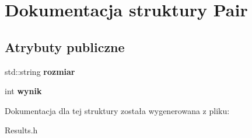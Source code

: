 \hypertarget{struct_pair}{}\section{Dokumentacja struktury Pair}
\label{struct_pair}
\subsection*{Atrybuty publiczne}
\begin{DoxyCompactItemize}
\item 
\hypertarget{struct_pair_ac7bc0b37d632674e21e292a1bfc64847}{}std\+::string {\bfseries rozmiar}\label{struct_pair_ac7bc0b37d632674e21e292a1bfc64847}

\item 
\hypertarget{struct_pair_a166971bff5d8b86e25f71dc1d1252daf}{}int {\bfseries wynik}\label{struct_pair_a166971bff5d8b86e25f71dc1d1252daf}

\end{DoxyCompactItemize}


Dokumentacja dla tej struktury została wygenerowana z pliku\+:\begin{DoxyCompactItemize}
\item 
Results.\+h\end{DoxyCompactItemize}
